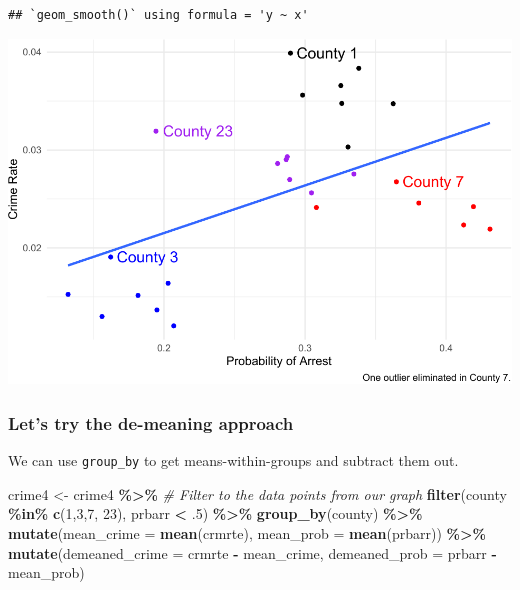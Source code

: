 \documentclass[
]{article}
\newenvironment{Shaded}{\begin{snugshade}}{\end{snugshade}}
\newcommand{\AttributeTok}[1]{\textcolor[rgb]{0.13,0.29,0.53}{#1}}
\newcommand{\CommentTok}[1]{\textcolor[rgb]{0.56,0.35,0.01}{\textit{#1}}}
\newcommand{\DecValTok}[1]{\textcolor[rgb]{0.00,0.00,0.81}{#1}}
\newcommand{\FunctionTok}[1]{\textcolor[rgb]{0.13,0.29,0.53}{\textbf{#1}}}
\newcommand{\NormalTok}[1]{#1}
\newcommand{\OtherTok}[1]{\textcolor[rgb]{0.56,0.35,0.01}{#1}}
\newcommand{\SpecialCharTok}[1]{\textcolor[rgb]{0.81,0.36,0.00}{\textbf{#1}}}
\begin{document}
\begin{verbatim}
## `geom_smooth()` using formula = 'y ~ x'
\end{verbatim}

\includegraphics{11-panel-twfe_files/figure-latex/visualize-crime-1.pdf}

\hypertarget{lets-try-the-de-meaning-approach}{%
\subsubsection{Let's try the de-meaning
approach}\label{lets-try-the-de-meaning-approach}}

We can use \texttt{group\_by} to get means-within-groups and subtract
them out.

\begin{Shaded}
\begin{Highlighting}[]
\NormalTok{crime4 }\OtherTok{\textless{}{-}}\NormalTok{ crime4 }\SpecialCharTok{\%\textgreater{}\%}
  \CommentTok{\# Filter to the data points from our graph}
  \FunctionTok{filter}\NormalTok{(county }\SpecialCharTok{\%in\%} \FunctionTok{c}\NormalTok{(}\DecValTok{1}\NormalTok{,}\DecValTok{3}\NormalTok{,}\DecValTok{7}\NormalTok{, }\DecValTok{23}\NormalTok{),}
\NormalTok{         prbarr }\SpecialCharTok{\textless{}}\NormalTok{ .}\DecValTok{5}\NormalTok{) }\SpecialCharTok{\%\textgreater{}\%}
  \FunctionTok{group\_by}\NormalTok{(county) }\SpecialCharTok{\%\textgreater{}\%}
  \FunctionTok{mutate}\NormalTok{(}\AttributeTok{mean\_crime =} \FunctionTok{mean}\NormalTok{(crmrte),}
         \AttributeTok{mean\_prob =} \FunctionTok{mean}\NormalTok{(prbarr)) }\SpecialCharTok{\%\textgreater{}\%}
  \FunctionTok{mutate}\NormalTok{(}\AttributeTok{demeaned\_crime =}\NormalTok{ crmrte }\SpecialCharTok{{-}}\NormalTok{ mean\_crime,}
         \AttributeTok{demeaned\_prob =}\NormalTok{ prbarr }\SpecialCharTok{{-}}\NormalTok{ mean\_prob)}
\end{Highlighting}
\end{Shaded}
\end{document}
